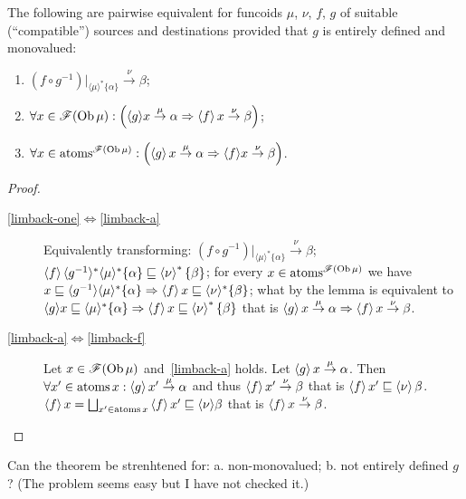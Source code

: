 \begin{prop}
  The following are pairwise equivalent for funcoids $\mu$, $\nu$, $f$, $g$ of
  suitable (``compatible'') sources and destinations provided that $g$ is
  entirely defined and monovalued:
  \begin{enumerate}
    \item\label{limback-one} $(f \circ g^{- 1}) |_{\langle \mu \rangle^{\ast} \{ \alpha \}}
    \overset{\nu}{\rightarrow} \beta$;
    
    \item\label{limback-f} $\forall x \in \mathscr{F} (\operatorname{Ob} \mu) : \left( \langle g
    \rangle x \overset{\mu}{\rightarrow} \alpha \Rightarrow \left\langle f\right\rangle
    x \overset{\nu}{\rightarrow} \beta \right)$;
    
    \item\label{limback-a} $\forall x \in \operatorname{atoms}^{\mathscr{F} (\operatorname{Ob} \mu)} : \left(
    \left\langle g\right\rangle x \overset{\mu}{\rightarrow} \alpha \Rightarrow \langle
    f \rangle x \overset{\nu}{\rightarrow} \beta \right)$.
  \end{enumerate}
\end{prop}

\begin{proof}
  ~
  \begin{description}
    \item[\ref{limback-one}$\Leftrightarrow$\ref{limback-a}] Equivalently transforming: $(f \circ g^{- 1})
    |_{\langle \mu \rangle^{\ast} \{ \alpha \}} \overset{\nu}{\rightarrow}
    \beta$; $\left\langle f\right\rangle \langle g^{- 1} \rangle^{\ast} \langle \mu
    \rangle^{\ast} \{ \alpha \} \sqsubseteq \left\langle \nu\right\rangle^{\ast} \{
    \beta \}$; for every $x \in \operatorname{atoms}^{\mathscr{F} (\operatorname{Ob} \mu)}$ we
    have $x \sqsubseteq \langle g^{- 1} \rangle \langle \mu \rangle^{\ast} \{
    \alpha \} \Rightarrow \left\langle f\right\rangle x \sqsubseteq \langle \nu
    \rangle^{\ast} \{ \beta \}$; what by the lemma is equivalent to $\langle g
    \rangle x \sqsubseteq \langle \mu \rangle^{\ast} \{ \alpha \} \Rightarrow
    \left\langle f\right\rangle x \sqsubseteq \left\langle \nu\right\rangle^{\ast} \{ \beta \}$
    that is $\left\langle g\right\rangle x \overset{\mu}{\rightarrow} \alpha \Rightarrow
    \left\langle f\right\rangle x \overset{\nu}{\rightarrow} \beta$.
    
    \item[\ref{limback-a}$\Leftrightarrow$\ref{limback-f}] Let $x \in \mathscr{F} (\operatorname{Ob} \mu)$ and~\ref{limback-a}
    holds. Let $\left\langle g\right\rangle x \overset{\mu}{\rightarrow} \alpha$. Then
    $\forall x' \in \operatorname{atoms} x : \left\langle g\right\rangle x'
    \overset{\mu}{\rightarrow} \alpha$ and thus $\left\langle f\right\rangle x'
    \overset{\nu}{\rightarrow} \beta$ that is $\left\langle f\right\rangle x'
    \sqsubseteq \left\langle \nu\right\rangle \beta$. $\supfun{f} x =
    \bigsqcup_{x' \in \atoms x} \supfun{f} x' \sqsubseteq \langle
    \nu \rangle \beta$ that is $\left\langle f\right\rangle x \overset{\nu}{\rightarrow}
    \beta$.
  \end{description}
\end{proof}

\begin{problem}
  Can the theorem be strenhtened for: a. non-monovalued; b. not entirely defined $g$?
  (The problem seems easy but I have not checked it.)
\end{problem}
